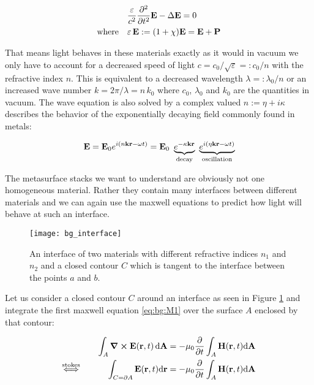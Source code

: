 \begin{equation}
\begin{aligned}
    &\frac{\varepsilon}{c^2} \pdv[2] t \vb E - \Delta \vb E = 0\\
    \qq*{where} &\varepsilon \, \vb E := \qty(1 + \chi) \vb E = \vb E + \vb P
\end{aligned}
\end{equation}

That means light behaves in these materials exactly as it would in vacuum we only have to account for a decreased speed of light
$c = {c_0} / {\sqrt{\varepsilon}} =: {c_0} / {n}$
with the refractive index $n$.
This is equivalent to a decreased wavelength
$\lambda =: {\lambda_0} / {n}$
or an increased wave number
$k = {2 \pi} / {\lambda} = n \, k_0$
where $c_0$, $\lambda_0$ and $k_0$ are the quantities in vacuum.
The wave equation is also solved by a complex valued $n := \eta + i \kappa$ describes the behavior of the exponentially decaying field commonly found in metals:

\begin{equation}
    \vb E = \vb E_0 e^{i(n \vb k \vb r - \omega t)}
    = \vb E_0 \
    \underbrace{e^{-\kappa \vb k \vb r}}_{\mathrm{
    decay}} \
    \underbrace{e^{i(\eta \vb k \vb r - \omega t)}}_{\mathrm{
    oscillation}}
\end{equation}

The metasurface stacks we want to understand are obviously not one homogeneous material. Rather they contain many interfaces between different materials and we can again use the maxwell equations to predict how light will behave at such an interface.
\\

\begin{figure}[H]
    \centering
    \texttt{[image: bg\_interface]}
    \caption{An interface of two materials with different refractive indices $n_1$ and $n_2$ and a closed contour $C$ which is tangent to the interface between the points $a$ and $b$.}
    \label{fig:bg:interface}
\end{figure}

Let us consider a closed contour $C$ around an interface as seen in Figure \ref{fig:bg:interface} and integrate the first maxwell equation \eqref{eq:bg:M1} over the surface $A$ enclosed by that contour:

\begin{equation}
\begin{aligned}
    \int_A \curl \vb E(\vb r, t) \, \dd \vb A
    &= - \mu_0 \pdv t \int_A \vb H(\vb r, t) \dd \vb A\\
    \overset{\mathrm{stokes}}{\Longleftrightarrow} \hspace{3em}
    \int_{C = \partial A} \vb E(\vb r, t) \dd \vb r
    &= - \mu_0 \pdv t \int_A \vb H(\vb r, t) \dd \vb A\\
\end{aligned}
\end{equation}

